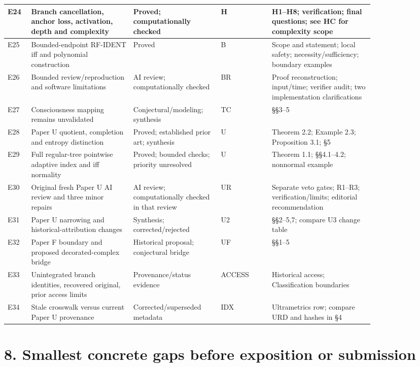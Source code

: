 \documentclass[10pt,letterpaper]{article}
\begin{document}
\begin{longtable}{@{}P{0.050\linewidth}P{0.246\linewidth}P{0.180\linewidth}P{0.123\linewidth}P{0.245\linewidth}@{}}
E24 & Branch cancellation, anchor loss, activation, depth and complexity & Proved; computationally checked & H & H1--H8; verification; final questions; see HC for complexity scope \\ \hline
E25 & Bounded-endpoint RF-IDENT iff and polynomial construction & Proved & B & Scope and statement; local safety; necessity/sufficiency; boundary examples \\ \hline
E26 & Bounded review/reproduction and software limitations & AI review; computationally checked & BR & Proof reconstruction; input/time; verifier audit; two implementation clarifications \\ \hline
E27 & Consciousness mapping remains unvalidated & Conjectural/modeling; synthesis & TC & \S{}\S{}3--5 \\ \hline
E28 & Paper U quotient, completion and entropy distinction & Proved; established prior art; synthesis & U & Theorem 2.2; Example 2.3; Proposition 3.1; \S{}5 \\ \hline
E29 & Full regular-tree pointwise adaptive index and iff normality & Proved; bounded checks; priority unresolved & U & Theorem 1.1; \S{}\S{}4.1--4.2; nonnormal example \\ \hline
E30 & Original fresh Paper U AI review and three minor repairs & AI review; computationally checked in that review & UR & Separate veto gates; R1--R3; verification/limits; editorial recommendation \\ \hline
E31 & Paper U narrowing and historical-attribution changes & Synthesis; corrected/rejected & U2 & \S{}\S{}2--5,7; compare U3 change table \\ \hline
E32 & Paper F boundary and proposed decorated-complex bridge & Historical proposal; conjectural bridge & UF & \S{}\S{}1--5 \\ \hline
E33 & Unintegrated branch identities, recovered original, prior access limits & Provenance/status evidence & ACCESS & Historical access; Classification boundaries \\ \hline
E34 & Stale crosswalk versus current Paper U provenance & Corrected/superseded metadata & IDX & Ultrametrics row; compare URD and hashes in \S{}4 \\ \hline
\end{longtable}
\endgroup


\section*{8. Smallest concrete gaps before exposition or submission}
\end{document}
